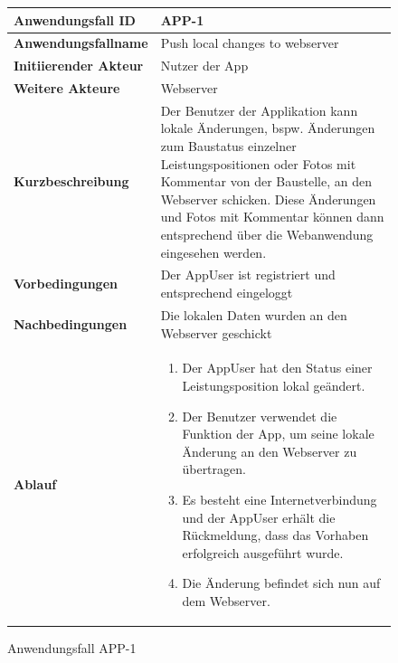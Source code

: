 \begin{figure}[h]
	\centering
	\begin{tabularx}{\textwidth}{ X | X }
		\textbf{Anwendungsfall ID} & APP-1 \\ \hline
		\textbf{Anwendungsfallname} & Push local changes to webserver\\ \hline
		\textbf{Initiierender Akteur} & Nutzer der App \\ \hline
		\textbf{Weitere Akteure} & Webserver  \\ \hline
		\textbf{Kurzbeschreibung} & Der Benutzer der Applikation kann lokale \"Anderungen,  bspw. \"Anderungen zum Baustatus einzelner Leistungspositionen oder Fotos mit Kommentar von der Baustelle,  an den Webserver schicken.  Diese \"Anderungen und Fotos mit Kommentar k\"onnen dann entsprechend  \"uber die Webanwendung eingesehen werden.  \\ \hline
		\textbf{Vorbedingungen} & Der AppUser ist registriert und entsprechend eingeloggt \\ \hline
		\textbf{Nachbedingungen} & Die lokalen Daten wurden an den Webserver geschickt\\ \hline
		\textbf{Ablauf} &
			\begin{enumerate}
				\item Der AppUser hat den Status einer Leistungsposition lokal ge\"andert.
				\item Der Benutzer verwendet die Funktion der App,  um seine lokale \"Anderung an den Webserver zu \"ubertragen.
				\item Es besteht eine Internetverbindung und der AppUser erh\"alt die R\"uckmeldung, dass das Vorhaben erfolgreich ausgef\"uhrt wurde.  
				\item Die \"Anderung befindet sich nun auf dem Webserver.
			\end{enumerate}
			\end{tabularx}
	\caption{Anwendungsfall APP-1}
	\label{fig:anwendungsfall-app-tabelle-APP-1-1}
\end{figure}
